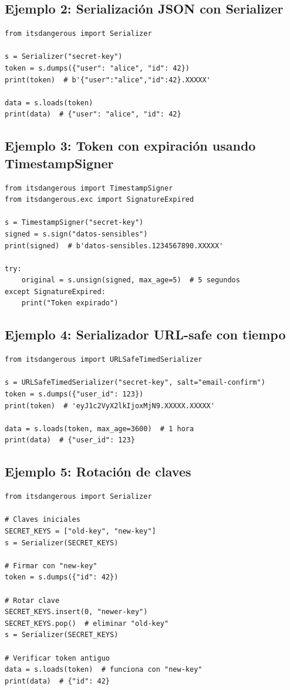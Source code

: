 \documentclass[11pt,a4paper]{article}
\begin{document}
\subsection*{Ejemplo 2: Serialización JSON con Serializer}


\begin{lstlisting}
from itsdangerous import Serializer

s = Serializer("secret-key")
token = s.dumps({"user": "alice", "id": 42})
print(token)  # b'{"user":"alice","id":42}.XXXXX'

data = s.loads(token)
print(data)  # {"user": "alice", "id": 42}
\end{lstlisting}


\subsection*{Ejemplo 3: Token con expiración usando TimestampSigner}


\begin{lstlisting}
from itsdangerous import TimestampSigner
from itsdangerous.exc import SignatureExpired

s = TimestampSigner("secret-key")
signed = s.sign("datos-sensibles")
print(signed)  # b'datos-sensibles.1234567890.XXXXX'

try:
    original = s.unsign(signed, max_age=5)  # 5 segundos
except SignatureExpired:
    print("Token expirado")
\end{lstlisting}


\subsection*{Ejemplo 4: Serializador URL-safe con tiempo}


\begin{lstlisting}
from itsdangerous import URLSafeTimedSerializer

s = URLSafeTimedSerializer("secret-key", salt="email-confirm")
token = s.dumps({"user_id": 123})
print(token)  # 'eyJ1c2VyX2lkIjoxMjN9.XXXXX.XXXXX'

data = s.loads(token, max_age=3600)  # 1 hora
print(data)  # {"user_id": 123}
\end{lstlisting}


\subsection*{Ejemplo 5: Rotación de claves}


\begin{lstlisting}
from itsdangerous import Serializer

# Claves iniciales
SECRET_KEYS = ["old-key", "new-key"]
s = Serializer(SECRET_KEYS)

# Firmar con "new-key"
token = s.dumps({"id": 42})

# Rotar clave
SECRET_KEYS.insert(0, "newer-key")
SECRET_KEYS.pop()  # eliminar "old-key"
s = Serializer(SECRET_KEYS)

# Verificar token antiguo
data = s.loads(token)  # funciona con "new-key"
print(data)  # {"id": 42}
\end{lstlisting}
\end{document}
